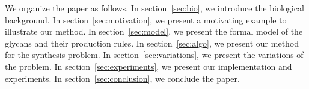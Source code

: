 We organize the paper as follows.
In section~\ref{sec:bio}, we introduce the biological background.
In section~\ref{sec:motivation}, we present a motivating example to illustrate our method.
In section~\ref{sec:model}, we present the formal model of the glycans
and their production rules.
In section~\ref{sec:algo}, we present our method for the synthesis problem.
In section~\ref{sec:variations}, we present the variations of the problem.
In section~\ref{sec:experiments}, we present our implementation  and experiments. %
In section~\ref{sec:conclusion}, we conclude the paper.


